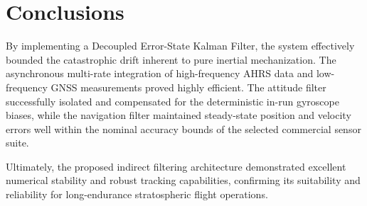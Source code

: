 \documentclass[a4paper,twoside,openany]{report}
\begin{document}
\chapter{Conclusions}

By implementing a Decoupled Error-State Kalman Filter, the system effectively bounded the catastrophic drift inherent to pure inertial mechanization. The asynchronous multi-rate integration of high-frequency AHRS data and low-frequency GNSS measurements proved highly efficient. The attitude filter successfully isolated and compensated for the deterministic in-run gyroscope biases, while the navigation filter maintained steady-state position and velocity errors well within the nominal accuracy bounds of the selected commercial sensor suite.

Ultimately, the proposed indirect filtering architecture demonstrated excellent numerical stability and robust tracking capabilities, confirming its suitability and reliability for long-endurance stratospheric flight operations.
\end{document}
